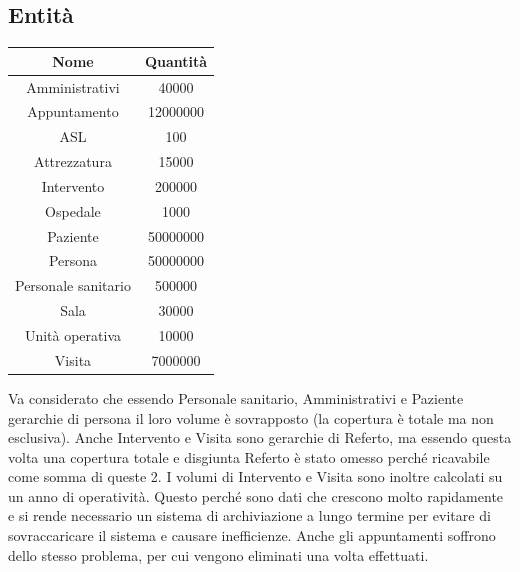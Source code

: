 \documentclass[a4paper,12pt]{report}
\begin{document}
\subsection{Entità}
\begin{center}
  \begin{tabular}{ c | S[table-format=8.0, table-space-text-pre=(, table-space-text-post=)] }
    Nome & Quantità \\
    \hline
    Amministrativi & 40000 \\
    Appuntamento & 12000000 \\
    ASL & 100 \\
    Attrezzatura & 15000 \\
    Intervento & 200000 \\
    Ospedale & 1000 \\
    Paziente & 50000000 \\
    Persona & 50000000 \\
    Personale sanitario & 500000 \\
    Sala & 30000 \\
    Unità operativa & 10000\\
    Visita & 7000000 \\
  \end{tabular}
\end{center}
 
Va considerato che essendo Personale sanitario, Amministrativi e Paziente gerarchie di persona il loro volume è 
sovrapposto (la copertura è totale ma non esclusiva). 
Anche Intervento e Visita sono gerarchie di Referto, ma essendo questa volta una copertura totale e disgiunta Referto
è stato omesso perché ricavabile come somma di queste 2.
I volumi di Intervento e Visita sono inoltre calcolati su un anno di operatività. Questo perché sono dati che crescono molto rapidamente 
e si rende necessario un sistema di archiviazione a lungo termine per evitare di sovraccaricare il sistema e causare inefficienze.
Anche gli appuntamenti soffrono dello stesso problema, per cui vengono eliminati una volta effettuati.
\end{document}
